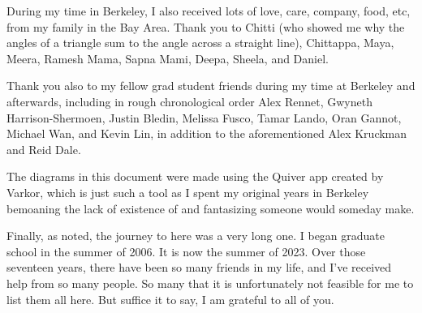 \documentclass{ucbthesis}
\begin{document}
\begin{frontmatter}
\begin{acknowledgements}
During my time in Berkeley, I also received lots of love, care, company, food, etc, from my family in the Bay Area. Thank you to Chitti (who showed me why the angles of a triangle sum to the angle across a straight line), Chittappa, Maya, Meera, Ramesh Mama, Sapna Mami, Deepa, Sheela, and Daniel.

Thank you also to my fellow grad student friends during my time at Berkeley and afterwards, including in rough chronological order Alex Rennet, Gwyneth Harrison-Shermoen, Justin Bledin, Melissa Fusco, Tamar Lando, Oran Gannot, Michael Wan, and Kevin Lin, in addition to the aforementioned Alex Kruckman and Reid Dale.

The diagrams in this document were made using the Quiver app created by Varkor, which is just such a tool as I spent my original years in Berkeley bemoaning the lack of existence of and fantasizing someone would someday make.

Finally, as noted, the journey to here was a very long one. I began graduate school in the summer of 2006. It is now the summer of 2023. Over those seventeen years, there have been so many friends in my life, and I've received help from so many people. So many that it is unfortunately not feasible for me to list them all here. But suffice it to say, I am grateful to all of you.
\end{acknowledgements}

\tableofcontents

\end{frontmatter}

\setcounter{chapter}{-1}








\printbibliography



% 
\end{document}
